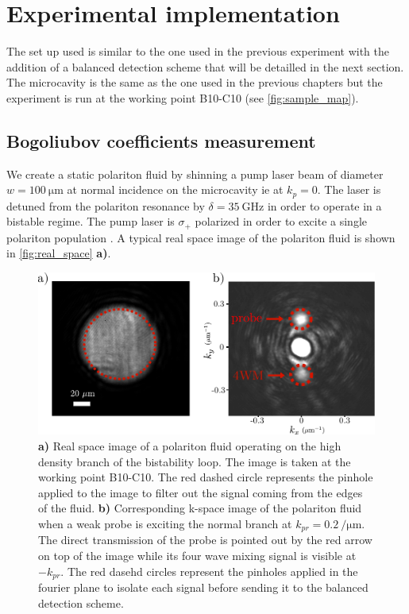 \section{Experimental implementation}
\label{sec:exp_impl}

The set up used is similar to the one used in the previous experiment with the addition of a balanced detection scheme that will be detailled in the next section. 
The microcavity is the same as the one used in the previous chapters but the experiment is run at the working point B10-C10 (see \autoref{fig:sample_map}).

\bigskip

\subsection{Bogoliubov coefficients measurement}


We create a static polariton fluid by shinning a pump laser beam of diameter $w=\SI{100}{\micro\meter}$ at normal incidence on the microcavity ie at $k_p=0$. The laser is detuned from the polariton resonance by
$\delta = \SI{35}{\giga\hertz}$ in order to operate in a bistable regime. The pump laser is $\sigma_+$ polarized in order to excite a single polariton population \cite{timofeev_exciton_2012}. A typical real space image of the polariton fluid is shown in \autoref{fig:real_space} \textbf{a)}. 


\begin{figure}
    \centering
    \includegraphics[width=1\textwidth]{chap_correlation/fig/r_and_k_space.pdf}
    \caption{\textbf{a)} Real space image of a polariton fluid operating on the high density branch of the bistability loop. The image is taken at the working point B10-C10. The red dashed circle represents
    the pinhole applied to the image to filter out the signal coming from the edges of the fluid. \textbf{b)} Corresponding k-space image of the polariton fluid when a weak probe is exciting the normal branch at $k_{pr}=\SI{0.2}{\per\micro\meter}$. 
    The direct transmission of the probe is pointed out by the red arrow on top of the image while its four wave mixing signal is visible at $-k_{pr}$. The red dasehd circles represent the pinholes applied 
    in the fourier plane to isolate each signal before sending it to the balanced detection scheme. }
    \label{fig:real_space}
\end{figure}


